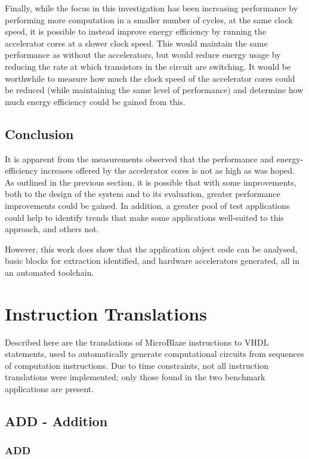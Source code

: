 \documentclass{UoYCSproject}
\begin{document}
Finally, while the focus in this investigation has been increasing performance by performing more
computation in a smaller number of cycles, at the same clock speed, it is possible to instead improve
energy efficiency by running the accelerator cores at a slower clock speed. This would maintain the same
performance as without the accelerators, but would reduce energy usage by reducing the rate at which
transistors in the circuit are switching. It would be worthwhile to measure how much the clock speed
of the accelerator cores could be reduced (while maintaining the same level of performance) and determine
how much energy efficiency could be gained from this.

\section{Conclusion}

It is apparent from the measurements observed that the performance and energy-efficiency increases
offered by the accelerator cores is not as high as was hoped. As outlined in the previous section,
it is possible that with some improvements, both to the design of the system and to its evaluation,
greater performance improvements could be gained. In addition, a greater pool of test applications
could help to identify trends that make some applications well-suited to this approach, and others not.

However, this work does show that the application object code can be analysed, basic blocks for extraction
identified, and hardware accelerators generated, all in an automated toolchain.

\appendix

\chapter{Instruction Translations}

Described here are the translations of MicroBlaze instructions to VHDL statements, used to automatically
generate computational circuits from sequences of computation instructions. Due to time constraints, not all
instruction translations were implemented; only those found in the two benchmark applications are present.

\section{ADD - Addition}

\subsection{ADD}
\end{document}
